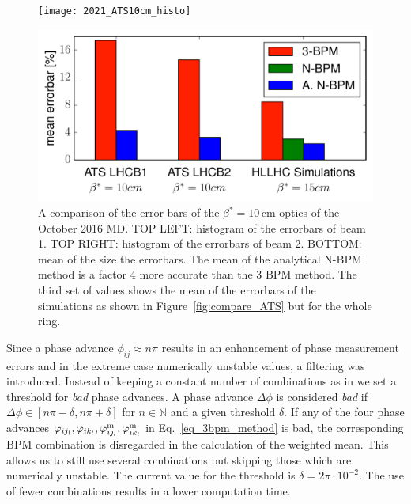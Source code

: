 \begin{figure}
	\centering
    \texttt{[image: 2021\_ATS10cm\_histo]}
	
	\includegraphics[width=.6\linewidth]{mean_errorbars}
	
	\caption{
        A comparison of the error bars of the $ \beta^*=10\,\text{cm} $ optics of the October 2016 MD.
        TOP LEFT: histogram of the errorbars of beam 1. TOP RIGHT: histogram of the errorbars of beam 2.
        BOTTOM: mean of the size the errorbars. The mean of the analytical N-BPM method is a factor
        4 more accurate than the 3 BPM method. The third set of values shows the mean of the errorbars
        of the simulations as shown in Figure~\ref{fig:compare_ATS} but for the whole ring.
        }
	\label{fig:HL_report/comparison_errorbars}
\end{figure}
%
Since a phase advance $ \phi_{ij} \approx n\pi $ results in an enhancement of phase measurement errors and in the extreme case numerically unstable values, a filtering was introduced. Instead of keeping a constant number of combinations as in \cite{LangnerNBPM} we set a threshold for \emph{bad} phase advances. A phase advance $ \Delta \phi $ is considered \emph{bad} if $ \Delta \phi \in [ n\pi - \delta, n\pi + \delta ] $ for $ n\in \mathbb{N} $ and a given threshold $ \delta $. If any of the four phase advances $ \varphi_{ij_l}, \varphi_{ik_l},\varphi_{ij_l}^\text{m},\varphi_{ik_l}^\text{m} $ in Eq.~\eqref{eq_3bpm_method} is bad, the corresponding BPM combination is disregarded in the calculation of the weighted mean. This allows us to still use several combinations but skipping those which are numerically unstable. The current value for the threshold is $ \delta = 2\pi \cdot 10^{-2}$. The use of fewer combinations results in a lower computation time. 


